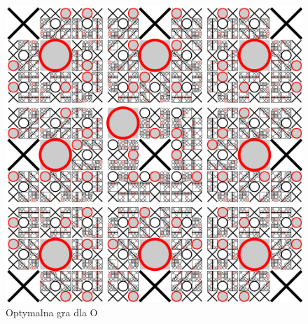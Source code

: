 \documentclass[polish,envcountsect,10pt]{beamer}
\begin{document}
\begin{frame}
\begin{columns}
                        \begin{figure}[H]
                            \centering
                            \includegraphics[width=\textwidth,natwidth=480,natheight=480]{images/480px-Tictactoe-O.svg.png}
                            \caption{Optymalna gra dla O}
                        \end{figure}
                    \end{columns}
                \end{frame}
\end{document}
